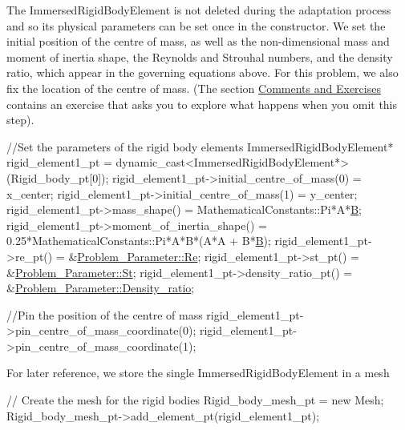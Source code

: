 The {\ttfamily Immersed\+Rigid\+Body\+Element} is not deleted during the adaptation process and so its physical parameters can be set once in the constructor. We set the initial position of the centre of mass, as well as the non-\/dimensional mass and moment of inertia shape, the Reynolds and Strouhal numbers, and the density ratio, which appear in the governing equations above. For this problem, we also fix the location of the centre of mass. (The section \hyperlink{index_comments}{Comments and Exercises} contains an exercise that asks you to explore what happens when you omit this step).


\begin{DoxyCodeInclude}
  
 \textcolor{comment}{//Set the parameters of the rigid body elements}
 ImmersedRigidBodyElement* rigid\_element1\_pt = 
  \textcolor{keyword}{dynamic\_cast<}ImmersedRigidBodyElement*\textcolor{keyword}{>}(Rigid\_body\_pt[0]);
 rigid\_element1\_pt->initial\_centre\_of\_mass(0) = x\_center;
 rigid\_element1\_pt->initial\_centre\_of\_mass(1) = y\_center; 
 rigid\_element1\_pt->mass\_shape() = MathematicalConstants::Pi*A*\hyperlink{namespaceProblem__Parameter_ac2362a46222574a21338a113e2bee27e}{B};
 rigid\_element1\_pt->moment\_of\_inertia\_shape() = 
 0.25*MathematicalConstants::Pi*A*B*(A*A + B*\hyperlink{namespaceProblem__Parameter_ac2362a46222574a21338a113e2bee27e}{B});
 rigid\_element1\_pt->re\_pt() = &\hyperlink{namespaceProblem__Parameter_acc656299287d4d9a8374c2c501750b4f}{Problem\_Parameter::Re};
 rigid\_element1\_pt->st\_pt() = &\hyperlink{namespaceProblem__Parameter_a8d9b76e390569bac0095bd0952281a30}{Problem\_Parameter::St};
 rigid\_element1\_pt->density\_ratio\_pt() = &\hyperlink{namespaceProblem__Parameter_a7fcb9a415485247d626190923235be2a}{Problem\_Parameter::Density\_ratio};

 \textcolor{comment}{//Pin the position of the centre of mass}
 rigid\_element1\_pt->pin\_centre\_of\_mass\_coordinate(0);
 rigid\_element1\_pt->pin\_centre\_of\_mass\_coordinate(1);

\end{DoxyCodeInclude}


For later reference, we store the single {\ttfamily Immersed\+Rigid\+Body\+Element} in a mesh


\begin{DoxyCodeInclude}

  \textcolor{comment}{// Create the mesh for the rigid bodies}
 Rigid\_body\_mesh\_pt = \textcolor{keyword}{new} Mesh;
 Rigid\_body\_mesh\_pt->add\_element\_pt(rigid\_element1\_pt);

\end{DoxyCodeInclude}


